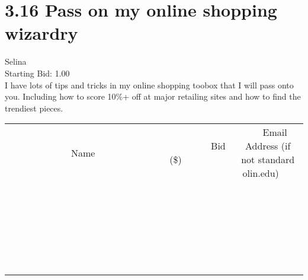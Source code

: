 \documentclass[11pt]{article}
\begin{document}
					\section*{3.16 Pass on my online shopping wizardry}
					Selina \\
					Starting Bid: 1.00 \\
					I have lots of tips and tricks in my online shopping toobox that I will pass onto you. Including how to score 10\%+ off at major retailing sites and how to find the trendiest pieces. \\
					[6ex]
					\begin{tabular}{c c c}
						~~~~~~~~~~~~~Name~~~~~~~~~~~~~ & ~~~~~~~~~Bid (\$)~~~~~~~~~ & ~~~Email Address (if not standard olin.edu)~~~ \\
				
 & & \\
\hline
 & & \\
\hline
 & & \\
\hline
 & & \\
\hline
 & & \\
\hline
 & & \\
\hline
 & & \\
\hline
 & & \\
\hline
 & & \\
\hline
 & & \\
\hline
 & & \\
\hline
 & & \\
\hline
 & & \\
\hline
 & & \\
\hline
 & & \\
\hline
 & & \\
\hline
 & & \\
\hline
 & & \\
\hline
 & & \\
\hline
 & & \\
\hline
 & & \\
\hline
 & & \\
\hline
 & & \\
\hline
 & & \\
\hline
 & & \\
\hline
 & & \\
\hline
					\end{tabular}
					\clearpage
				
\end{document}
